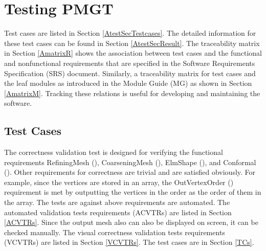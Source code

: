 \documentclass[12pt,titlepage]{article}
\begin{document}
\section{Testing PMGT \label{AtestSecTest}}
Test cases are listed in Section \ref{AtestSecTestcases}. The detailed information for these test cases can be found in Section \ref{AtestSecResult}. The traceability matrix in Section \ref{AmatrixR} shows the association between test cases and the functional and nonfunctional requirements that are specified in the Software Requirements Specification (SRS) document. Similarly, a traceability matrix for test cases and the leaf modules as introduced in the Module Guide (MG) as shown in Section \ref{AmatrixM}. Tracking these relations is useful for developing and maintaining the software.

\subsection{Test Cases \label{AtestSecTestcases}}
The correctness validation test is designed for verifying the functional requirements RefiningMesh (), CoarseningMesh (), ElmShape (), and Conformal (). Other requirements for correctness are trivial and are satisfied obviously. For example, since the vertices are stored in an array, the OutVertexOrder () requirement is met by outputting the vertices in the order as the order of them in the array. The tests are against above requirements are automated. The automated validation tests requirements (ACVTRs) are listed in Section \ref{ACVTRs}. Since the output mesh also can also be displayed on screen, it can be checked manually. The visual correctness validation tests requirements (VCVTRs) are listed in Section \ref{VCVTRs}. The test cases are in Section \ref{TCs}.
\end{document}
